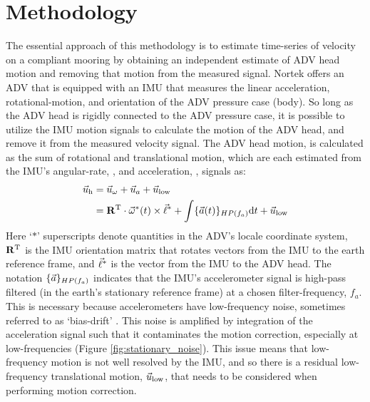 
\section{Methodology}
\label{sec:methods}


The essential approach of this methodology is to estimate time-series of velocity on a compliant mooring by obtaining an independent estimate of ADV head motion and removing that motion from the measured signal. Nortek offers an ADV that is equipped with an IMU that measures the linear acceleration, rotational-motion, and orientation of the ADV pressure case (body). So long as the ADV head is rigidly connected to the ADV pressure case, it is possible to utilize the IMU motion signals to calculate the motion of the ADV head, and remove it from the measured velocity signal.  The ADV head motion, is calculated as the sum of rotational and translational motion, which are each estimated from the IMU's angular-rate, \AngRt, and acceleration, \Accel, signals as:
\begin{align}
  \vec{u}_\mathrm{h} & = \vec{u}_\omega + \vec{u}_a + \vec{u}_\mathrm{low} \\
      & = \mathbf{R}^\mathrm{T} \cdot \vec{\omega}^*(t)\times\vec{\ell}^* + \int \{{\vec{a}}(t)\}_{HP(f_{a})} \mathrm{d}t + \vec{u}_\mathrm{low}
\end{align}
Here `$*$' superscripts denote quantities in the ADV's locale coordinate system, $\mathbf{R}^\mathrm{T}$ is the IMU orientation matrix that rotates vectors from the IMU to the earth reference frame, and $\vec{\ell}^*$ is the vector from the IMU to the ADV head. The notation $\{{\vec{a}}\}_{HP(f_a)}$ indicates that the IMU's accelerometer signal is high-pass filtered (in the earth's stationary reference frame) at a chosen filter-frequency, $f_a$. This is necessary because accelerometers have low-frequency noise, sometimes referred to as `bias-drift' . This noise is amplified by integration of the acceleration signal such that it contaminates the motion correction, especially at low-frequencies (Figure \ref{fig:stationary_noise}).  This issue means that low-frequency motion is not well resolved by the IMU, and so there is a residual low-frequency translational motion, $\vec{u}_\mathrm{low}$, that needs to be considered when performing motion correction.

